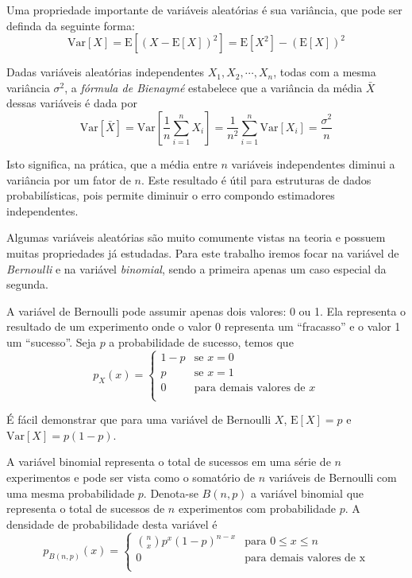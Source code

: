 Uma propriedade importante de variáveis aleatórias é sua variância, que pode ser definda da seguinte forma:
\[
    \text{Var}[X] = \text{E}[(X - \text{E}[X])^2] = \text{E}[X^2] - (\text{E}[X])^2
\]

Dadas variáveis aleatórias independentes $X_1, X_2, \cdots, X_n$, todas com a mesma variância $\sigma^2$, a \emph{fórmula de Bienaymé} estabelece que a variância da média $\bar{X}$ dessas variáveis é dada por
\[
    \text{Var}[\bar{X}] = \text{Var}\left[ \frac{1}{n} \sum_{i=1}^{n} X_i \right] = \frac{1}{n^2} \sum_{i=1}^{n} \text{Var}[X_i]  = \frac{\sigma^2}{n}
\]

Isto significa, na prática, que a média entre $n$ variáveis independentes diminui a variância por um fator de $n$. Este resultado é útil para estruturas de dados probabilísticas, pois permite diminuir o erro compondo estimadores independentes.

Algumas variáveis aleatórias são muito comumente vistas na teoria e possuem muitas propriedades já estudadas. Para este trabalho iremos focar na variável de \emph{Bernoulli} e na variável \emph{binomial}, sendo a primeira apenas um caso especial da segunda.

A variável de Bernoulli pode assumir apenas dois valores: 0 ou 1. Ela representa o resultado de um experimento onde o valor 0 representa um ``fracasso'' e o valor 1 um ``sucesso''. Seja $p$ a probabilidade de sucesso, temos que
\[
    p_X(x) = \begin{cases}
        1 - p  & \text{se } x = 0 \\
        p      & \text{se } x = 1 \\
        0      & \text{para demais valores de } x \\
        
    \end{cases}
\]

É fácil demonstrar que para uma variável de Bernoulli $X$, $\text{E}[X] = p$ e $\text{Var}[X] = p (1-p)$.

A variável binomial representa o total de sucessos em uma série de $n$ experimentos e pode ser vista como o somatório de $n$ variáveis de Bernoulli com uma mesma probabilidade $p$. Denota-se $B(n, p)$ a variável binomial que representa o total de sucessos de $n$ experimentos com probabilidade $p$. A densidade de probabilidade desta variável é
\[
    p_{B(n,p)}(x) = \begin{cases}
        {\binom{n}{x}} p^x(1-p)^{n-x}    & \text{para } 0 \leq x \leq n \\
        0                               & \text{para demais valores de x} \\
    \end{cases}
\]

